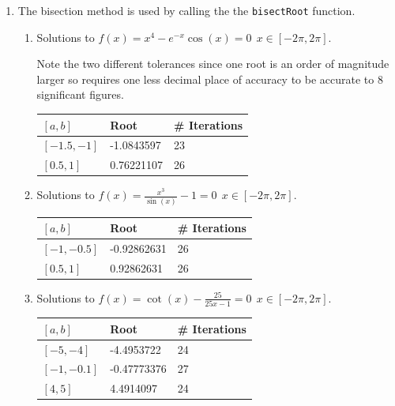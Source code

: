 \documentclass[a4paper,11pt]{article}
\begin{document}
\begin{enumerate}
	\item The bisection method is used by calling the the \verb*|bisectRoot| 
	function.
	
	
	
	\begin{enumerate}
		\item Solutions to $f(x) = x^{4} - e^{-x} \cos(x) = 0 \  \ 
		x\in[-2\pi,2\pi]$.
		
		Note the two different tolerances since one root is an order of 
		magnitude larger so requires one less decimal place of accuracy to be 
		accurate to 8 significant figures.
		\begin{table}[!h]
			\centering
			\begin{tabular}{l|ll}
				$[a,b]$     & Root       & \# Iterations \\ \hline
				$[-1.5,-1]$ & -1.0843597 & 23           \\
				$[0.5,1]$   & 0.76221107 & 26          
			\end{tabular}
		\end{table}
	
	
		\item Solutions to $f(x) = \frac{x^{3}}{\sin(x)} - 1 = 0 \  \ 
		x\in[-2\pi,2\pi]$.
		
		\begin{table}[!h]
			\centering
			\begin{tabular}{l|ll}
				$[a,b]$     & Root        & \# Iterations \\ \hline
				$[-1,-0.5]$ & -0.92862631 & 26            \\
				$[0.5,1]$   & 0.92862631  & 26           
			\end{tabular}
		\end{table}
	
	
		\item Solutions to $f(x) = \cot(x)	- \frac{25}{25x-1} = 0 \  \ 
		x\in[-2\pi,2\pi]$.
		
		\begin{table}[!h]
			\centering
			\begin{tabular}{l|ll}
				$[a,b]$     & Root        & \# Iterations \\ \hline
				$[-5,-4]$   & -4.4953722  & 24            \\
				$[-1,-0.1]$ & -0.47773376 & 27            \\
				$[4,5]$     & 4.4914097   & 24           
			\end{tabular}
		\end{table}
		

\end{enumerate}
\end{enumerate}
\end{document}
